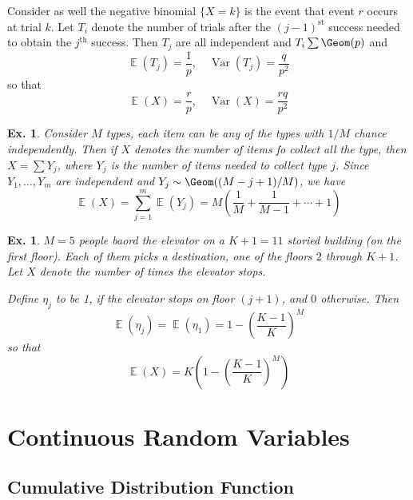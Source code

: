 \documentclass[12pt, a4paper]{book}
\DeclareMathOperator{\E}{\mathbb{E}}
\DeclareMathOperator{\Var}{Var}
\newtheorem{example}[theorem]{Ex.}
\theoremstyle{nonumberplain}
\begin{document}
Consider as well the negative binomial $\{X=k\}$ is the event that event $r$ occurs at trial $k$.
Let $T_i$ denote the number of trials after the $(j-1)^\text{st}$ success needed to obtain the $j^\text{th}$ success.
Then $T_j$ are all independent and $T_i\sum\Geom(p)$ and
\[\E(T_j)=\frac{1}{p},\quad\Var(T_j)=\frac{q}{p^2}\]
so that
\[\E(X)=\frac{r}{p},\quad\Var(X)=\frac{rq}{p^2}\]
\begin{example}
    Consider $M$ types, each item can be any of the types with $1/M$ chance independently.
    Then if $X$ denotes the number of items fo collect all the type, then $X=\sum Y_j$, where $Y_j$ is the number of items needed to collect type $j$.
    Since $Y_1,\ldots,Y_m$ are independent and $Y_j\sim\Geom((M-j+1)/M)$, we have
    \[\E(X)=\sum\limits_{j=1}^m\E(Y_j)=M\left(\frac{1}{M}+\frac{1}{M-1}+\cdots+1\right)\]
\end{example}
\begin{example}
    $M=5$ people baord the elevator on a $K+1=11$ storied building (on the first floor).
    Each of them picks a destination, one of the floors $2$ through $K+1$.
    Let $X$ denote the number of times the elevator stops.

    Define $\eta_j$ to be 1, if the elevator stops on floor $(j+1)$, and $0$ otherwise.
    Then
    \[\E(\eta_j)=\E(\eta_1)=1-\left(\frac{K-1}{K}\right)^M\]
    so that
    \[\E(X)=K\left(1-\left(\frac{K-1}{K}\right)^M\right)\]
\end{example}
\chapter{Continuous Random Variables}
\section{Cumulative Distribution Function}
\end{document}
